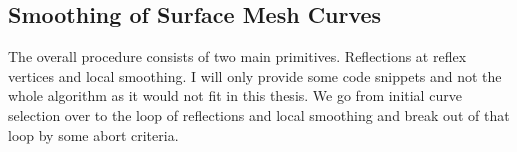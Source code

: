 \documentclass{stdlocal}
\begin{document}



\subsection{Smoothing of Surface Mesh Curves} %
\label{sub:smoothing_of_surface_mesh_curves}
  The overall procedure consists of two main primitives.
  Reflections at reflex vertices and local smoothing.
  I will only provide some code snippets and not the whole algorithm as it would not fit in this thesis.
  We go from initial curve selection over to the loop of reflections and local smoothing and break out of that loop by some abort criteria.
\end{document}
